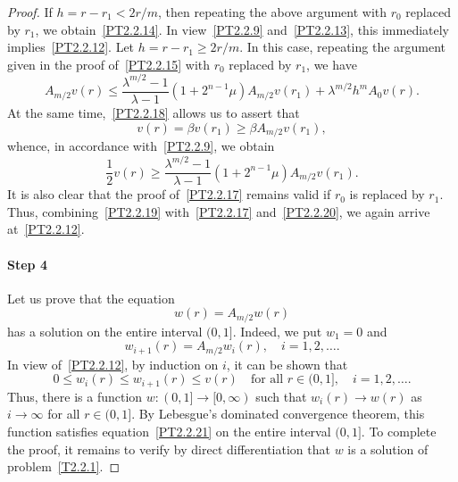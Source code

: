 \documentclass[11pt]{amsart}
\theoremstyle{definition}
\numberwithin{equation}{section}
\begin{document}
\begin{proof}
If $h = r - r_1 < 2 r / m$, then repeating the above argument with $r_0$ replaced by $r_1$, we obtain~\eqref{PT2.2.14}. 
In view~\eqref{PT2.2.9} and~\eqref{PT2.2.13}, this immediately implies~\eqref{PT2.2.12}.
Let $h = r - r_1 \ge 2 r / m$.
In this case, repeating the argument given in the proof of~\eqref{PT2.2.15} with $r_0$ replaced by $r_1$, we have
\begin{equation}
	A_{m / 2} v (r)
	\le
	\frac{
		\lambda^{m / 2} - 1
	}{
		\lambda - 1
	}
	(1 + 2^{n - 1} \mu)
	A_{m / 2} v (r_1)
	+
	\lambda^{m / 2}
	h^m
	A_0 v (r).
	\label{PT2.2.19}
\end{equation}
At the same time,~\eqref{PT2.2.18} allows us to assert that
$$
	v (r) = \beta v (r_1) \ge \beta A_{m / 2} v (r_1),
$$
whence, in accordance with~\eqref{PT2.2.9}, we obtain
\begin{equation}
	\frac{1}{2}
	v (r)
	\ge
	\frac{
		\lambda^{m / 2} - 1
	}{
		\lambda - 1
	}
	(1 + 2^{n - 1} \mu)
	A_{m / 2} v (r_1).
	\label{PT2.2.20}
\end{equation}
It is also clear that the proof of~\eqref{PT2.2.17} remains valid if $r_0$ is replaced by $r_1$.
Thus, combining~\eqref{PT2.2.19} with~\eqref{PT2.2.17} and~\eqref{PT2.2.20}, we again arrive at~\eqref{PT2.2.12}.

\paragraph{Step 4}
Let us prove that the equation
\begin{equation}
	w (r) = A_{m / 2} w (r)
	\label{PT2.2.21}
\end{equation}
has a solution on the entire interval $(0, 1]$. 
Indeed, we put $w_1 = 0$ and
$$
	w_{i + 1} (r) = A_{m / 2} w_i (r),
	\quad
	i = 1, 2, \ldots.
$$
In view of~\eqref{PT2.2.12}, by induction on $i$, it can be shown that 
$$
	0 \le w_i (r) \le w_{i + 1} (r) \le v (r) 
	\quad
	\mbox{for all } r \in (0, 1], 
	\quad
	i = 1, 2, \ldots.
$$
Thus, there is a function $w : (0, 1] \to [0, \infty)$ such that $w_i (r) \to w (r)$ as $i \to \infty$ for all $r \in (0, 1]$.
By Lebesgue's dominated convergence theorem, this function satisfies equation~\eqref{PT2.2.21} on the entire interval $(0, 1]$.
To complete the proof, it remains to verify by direct differentiation that $w$ is a solution of problem~\eqref{T2.2.1}.
\end{proof} 
\end{document}
